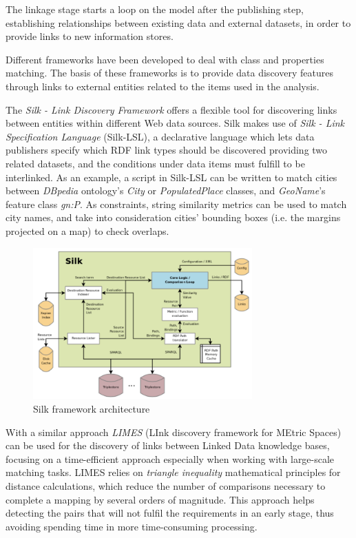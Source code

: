 The linkage stage starts a loop on the model after the publishing step, establishing relationships between existing data and external datasets, in order to provide links to new information stores.

Different frameworks have been developed to deal with class and properties matching. The basis of these frameworks is to provide data discovery features through links to external entities related to the items used in the analysis.

The \textit{Silk - Link Discovery Framework} \cite{volz2009silk} offers a flexible tool for discovering links between entities within different Web data sources. Silk makes use of \textit{Silk - Link Specification Language} (Silk-LSL), a declarative language which lets data publishers specify which RDF link types should be discovered providing two related datasets, and the conditions under data items must fulfill to be interlinked. As an example, a script in Silk-LSL can be written to match cities between \textit{DBpedia} ontology's \textit{City} or \textit{PopulatedPlace} classes, and \textit{GeoName}'s feature class \textit{gn:P}. As constraints, string similarity metrics can be used to match city names, and take into consideration cities' bounding boxes (i.e. the margins projected on a map) to check overlaps.

\begin{figure}
    \center
    \includegraphics[width=0.75\textwidth]{img/ld_approach/silk.png}
    \caption{Silk framework architecture}
\end{figure}

With a similar approach \textit{LIMES} (LInk discovery framework for MEtric Spaces) \cite{ngomo2011limes} can be used for the discovery of links between Linked Data knowledge bases, focusing on a time-efficient approach especially when working with large-scale matching tasks. LIMES relies on \textit{triangle inequality} mathematical principles for distance calculations, which reduce the number of comparisons necessary to complete a mapping by several orders of magnitude. This approach helps detecting the pairs that will not fulfil the requirements in an early stage, thus avoiding spending time in more time-consuming processing.

